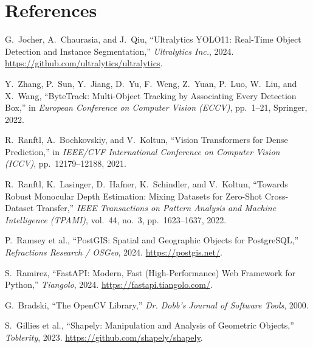 \documentclass[11pt,a4paper]{article}
\begin{document}
\section{References}
\begin{enumerate}[label={[\arabic*]}, leftmargin=*]
    \item G.~Jocher, A.~Chaurasia, and J.~Qiu, ``Ultralytics YOLO11: Real-Time Object Detection and Instance Segmentation,'' \textit{Ultralytics Inc.}, 2024. \url{https://github.com/ultralytics/ultralytics}.
    \item Y.~Zhang, P.~Sun, Y.~Jiang, D.~Yu, F.~Weng, Z.~Yuan, P.~Luo, W.~Liu, and X.~Wang, ``ByteTrack: Multi-Object Tracking by Associating Every Detection Box,'' in \textit{European Conference on Computer Vision (ECCV)}, pp.~1--21, Springer, 2022.
    \item R.~Ranftl, A.~Bochkovskiy, and V.~Koltun, ``Vision Transformers for Dense Prediction,'' in \textit{IEEE/CVF International Conference on Computer Vision (ICCV)}, pp.~12179--12188, 2021.
    \item R.~Ranftl, K.~Lasinger, D.~Hafner, K.~Schindler, and V.~Koltun, ``Towards Robust Monocular Depth Estimation: Mixing Datasets for Zero-Shot Cross-Dataset Transfer,'' \textit{IEEE Transactions on Pattern Analysis and Machine Intelligence (TPAMI)}, vol.~44, no.~3, pp.~1623--1637, 2022.
    \item P.~Ramsey et al., ``PostGIS: Spatial and Geographic Objects for PostgreSQL,'' \textit{Refractions Research / OSGeo}, 2024. \url{https://postgis.net/}.
    \item S.~Ramirez, ``FastAPI: Modern, Fast (High-Performance) Web Framework for Python,'' \textit{Tiangolo}, 2024. \url{https://fastapi.tiangolo.com/}.
    \item G.~Bradski, ``The OpenCV Library,'' \textit{Dr. Dobb's Journal of Software Tools}, 2000.
    \item S.~Gillies et al., ``Shapely: Manipulation and Analysis of Geometric Objects,'' \textit{Toblerity}, 2023. \url{https://github.com/shapely/shapely}.
\end{enumerate}
\end{document}
